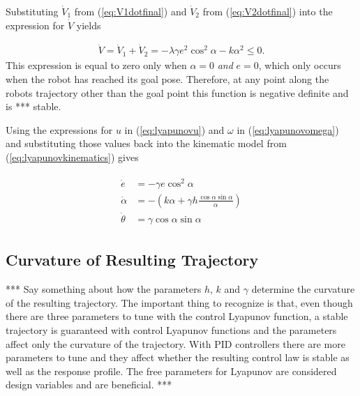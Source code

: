 Substituting $\dot{V}_1$ from (\ref{eq:V1dotfinal}) and $\dot{V}_2$ from (\ref{eq:V2dotfinal}) into the expression for $\dot{V}$ yields

\begin{align}
\label{eq:Vfinal}
\dot{V} = \dot{V}_1 + \dot{V}_2 = -\lambda\gamma e^2\cos^2\alpha - k\alpha^2 \leq 0.
\end{align}
This expression is equal to zero only when $\alpha=0$ \textit{and} $e=0$, which only occurs when the robot has reached its goal pose. Therefore, at any point along the robots trajectory other than the goal point this function is negative definite and is *** stable.

Using the expressions for $u$ in (\ref{eq:lyapunovu}) and $\omega$ in (\ref{eq:lyapunovomega}) and substituting those values back into the kinematic model from (\ref{eq:lyapunovkinematics}) gives

\begin{align}
\label{eq:lyapunovfinalkinematics}
\begin{split}
\dot{e} &= -\gamma e\cos^2\alpha \\
\dot{\alpha} &= -\left(k\alpha + \gamma h\frac{\cos\alpha\sin\alpha}{\alpha}\right) \\
\dot{\theta} &= \gamma\cos\alpha\sin\alpha
\end{split}
\end{align}

\subsection{Curvature of Resulting Trajectory}
*** Say something about how the parameters $h$, $k$ and $\gamma$ determine the curvature of the resulting trajectory. The important thing to recognize is that, even though there are three parameters to tune with the control Lyapunov function, a stable trajectory is guaranteed with control Lyapunov functions and the parameters affect only the curvature of the trajectory. With PID controllers there are more parameters to tune and they affect whether the resulting control law is stable as well as the response profile. The free parameters for Lyapunov are considered design variables and are beneficial. ***